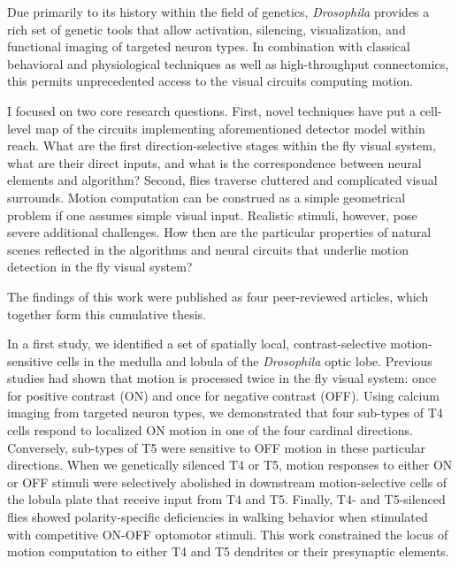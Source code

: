 Due primarily to its history within the field of genetics, \textit{Drosophila} provides a rich set of genetic tools that allow activation, silencing, visualization, and functional imaging of targeted neuron types. In combination with classical behavioral and physiological techniques as well as high-throughput connectomics, this permits unprecedented access to the visual circuits computing motion.

I focused on two core research questions. First, novel techniques have put a cell-level map of the circuits implementing aforementioned detector model within reach. What are the first direction-selective stages within the fly visual system, what are their direct inputs, and what is the correspondence between neural elements and algorithm? Second, flies traverse cluttered and complicated visual surrounds. Motion computation can be construed as a simple geometrical problem if one assumes simple visual input. Realistic stimuli, however, pose severe additional challenges. How then are the particular properties of natural scenes reflected in the algorithms and neural circuits that underlie motion detection in the fly visual system?

The findings of this work were published as four peer-reviewed articles, which together form this cumulative thesis.

In a first study, we identified a set of spatially local, contrast-selective motion-sensitive cells in the medulla and lobula of the \textit{Drosophila} optic lobe. Previous studies had shown that motion is processed twice in the fly visual system: once for positive contrast (ON) and once for negative contrast (OFF). Using calcium imaging from targeted neuron types, we demonstrated that four sub-types of T4 cells respond to localized ON motion in one of the four cardinal directions. Conversely, sub-types of T5 were sensitive to OFF motion in these particular directions. When we genetically silenced T4 or T5, motion responses to either ON or OFF stimuli were selectively abolished in downstream motion-selective cells of the lobula plate that receive input from T4 and T5. Finally, T4- and T5-silenced flies showed polarity-specific deficiencies in walking behavior when stimulated with competitive ON-OFF optomotor stimuli. This work constrained the locus of motion computation to either T4 and T5 dendrites or their presynaptic elements.

